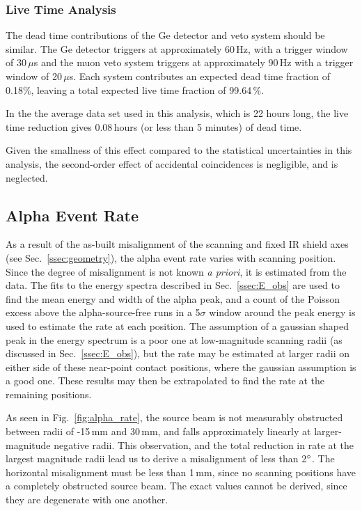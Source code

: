 \subsubsection{Live Time Analysis}
The dead time contributions of the Ge detector and veto system should be similar. The Ge detector triggers at approximately 60\,Hz, with a trigger window of 30\,$\mu$s and the muon veto system triggers at approximately 90\,Hz with a trigger window of 20\,$\mu$s. Each system contributes an expected dead time fraction of 0.18\%, leaving a total expected live time fraction of 99.64\,\%. 

In the the average data set used in this analysis, which is 22 hours long, the live time reduction gives 0.08\,hours (or less than 5 minutes) of dead time. 

Given the smallness of this effect compared to the statistical uncertainties in this analysis, the second-order effect of accidental coincidences is negligible, and is neglected.  

\subsection{Alpha Event Rate}\label{ssec:rate}
As a result of the as-built misalignment of the scanning and fixed IR shield axes (see Sec.~\ref{ssec:geometry}), the alpha event rate varies with scanning position. Since the degree of misalignment is not known {\it a priori}, it is estimated from the data. The fits to the energy spectra described in Sec.~\ref{ssec:E_obs} are used to find the mean energy and width of the alpha peak, and a count of the Poisson excess above the alpha-source-free runs in a 5$\sigma$ window around the peak energy is used to estimate the rate at each position. The assumption of a gaussian shaped peak in the energy spectrum is a poor one at low-magnitude scanning radii (as discussed in Sec.~\ref{ssec:E_obs}), but the rate may be estimated at larger radii on either side of these near-point contact positions, where the gaussian assumption is a good one. These results may then be extrapolated to find the rate at the remaining positions. 

As seen in Fig.~\ref{fig:alpha_rate}, the source beam is not measurably obstructed between radii of -15\,mm and 30\,mm, and falls approximately linearly at larger-magnitude negative radii. This observation, and the total reduction in rate at the largest magnitude radii lead us to derive a misalignment of less than 2$\degree$. The horizontal misalignment must be less than 1\,mm, since no scanning positions have a completely obstructed source beam. The exact values cannot be derived, since they are degenerate with one another. 

